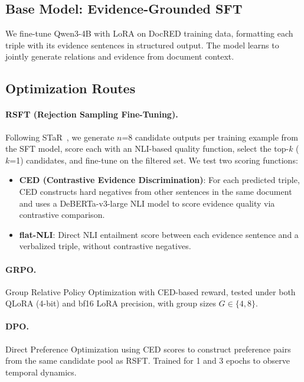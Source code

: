 \documentclass[11pt,a4paper]{article}
\begin{document}
\subsection{Base Model: Evidence-Grounded SFT}

We fine-tune Qwen3-4B with LoRA on DocRED training data, formatting each triple with its evidence sentences in structured output. The model learns to jointly generate relations and evidence from document context.

\subsection{Optimization Routes}

\paragraph{RSFT (Rejection Sampling Fine-Tuning).} Following STaR~\cite{zelikman2022star}, we generate $n$=8 candidate outputs per training example from the SFT model, score each with an NLI-based quality function, select the top-$k$ ($k$=1) candidates, and fine-tune on the filtered set. We test two scoring functions:

\begin{itemize}
\item \textbf{CED (Contrastive Evidence Discrimination)}: For each predicted triple, CED constructs hard negatives from other sentences in the same document and uses a DeBERTa-v3-large NLI model to score evidence quality via contrastive comparison.
\item \textbf{flat-NLI}: Direct NLI entailment score between each evidence sentence and a verbalized triple, without contrastive negatives.
\end{itemize}

\paragraph{GRPO.} Group Relative Policy Optimization with CED-based reward, tested under both QLoRA (4-bit) and bf16 LoRA precision, with group sizes $G \in \{4, 8\}$.

\paragraph{DPO.} Direct Preference Optimization using CED scores to construct preference pairs from the same candidate pool as RSFT. Trained for 1 and 3 epochs to observe temporal dynamics.
\end{document}
